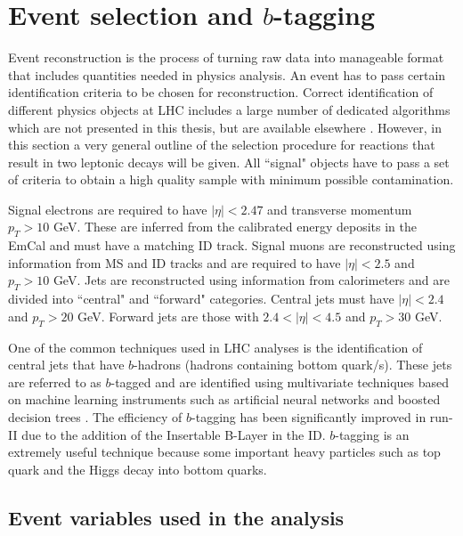



\section{Event selection and $b$-tagging}

Event reconstruction is the process of turning raw data into manageable format that includes quantities needed in physics analysis. An event has to pass certain identification criteria to be chosen for reconstruction. Correct identification of different physics objects at LHC includes a large number of dedicated algorithms which are not presented in this thesis, but are available elsewhere \citep{Aad:2016tuk}. 
However, in this section a very general outline of the selection procedure for reactions that result in two leptonic decays will be given. All ``signal" objects have to pass a set of criteria to obtain a high quality sample with minimum possible contamination.

Signal electrons are required to have $|\eta|<2.47$ and transverse momentum $p_{T}>10$ GeV. These are inferred from the calibrated  energy deposits in the EmCal and must have a matching ID track. Signal muons are reconstructed using information from MS and ID tracks and are required to have   $|\eta|<2.5$ and $p_{T}>10$ GeV. Jets are reconstructed using information from calorimeters and are divided into ``central" and ``forward" categories. Central jets must have $|\eta|<2.4$ and $p_{T}>20$ GeV. Forward jets are those with $2.4<|\eta|<4.5$ and $p_{T}>30$ GeV. 

One of the common techniques used in LHC analyses is the identification of central jets that have $b$-hadrons (hadrons containing bottom quark/s).  These jets are referred to as $b$-tagged and are identified using multivariate techniques based on machine learning instruments such as artificial neural networks and boosted decision trees \citep{Aad:2015ydr}. The efficiency of $b$-tagging has been significantly improved in run-II due to the addition of the Insertable B-Layer in the ID. $b$-tagging is an extremely useful technique because some important heavy particles such as top quark and the Higgs decay into bottom quarks.  

\subsection{Event variables used in the analysis}
\label{subsec:Variables}

